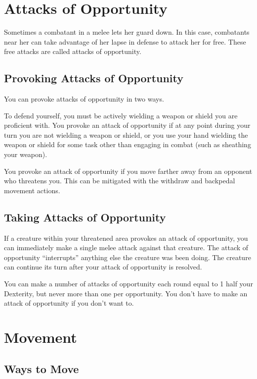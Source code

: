 \section{Attacks of Opportunity}
Sometimes a combatant in a melee lets her guard down. In this case, combatants near her can take advantage of her lapse in defense to attack her for free. These free attacks are called attacks of opportunity.

\subsection{Provoking Attacks of Opportunity}
You can provoke attacks of opportunity in two ways.

 To defend yourself, you must be actively wielding a weapon or shield you are proficient with. You provoke an attack of opportunity if at any point during your turn you are not wielding a weapon or shield, or you use your hand wielding the weapon or shield for some task other than engaging in combat (such as sheathing your weapon).

 You provoke an attack of opportunity if you move farther away from an opponent who threatens you. This can be mitigated with the withdraw and backpedal movement actions.

\subsection{Taking Attacks of Opportunity}
If a creature within your threatened area provokes an attack of opportunity, you can immediately make a single melee attack against that creature. The attack of opportunity ``interrupts'' anything else the creature was been doing. The creature can continue its turn after your attack of opportunity is resolved.

You can make a number of attacks of opportunity each round equal to 1 \add half your Dexterity, but never more than one per opportunity. You don't have to make an attack of opportunity if you don't want to.

\section{Movement}

\subsection{Ways to Move}

